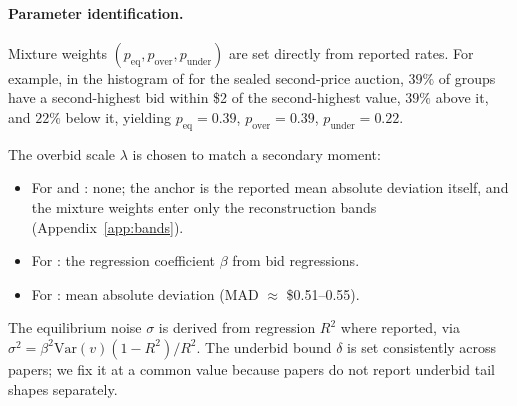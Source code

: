 \documentclass[acmsmall,screen,review]{acmart}
\newcommand{\rev}[1]{{\color{blue}#1}}
\newcommand{\rev}[1]{#1}
\begin{document}
\paragraph{Parameter identification.}
Mixture weights $(p_{\text{eq}}, p_{\text{over}}, p_{\text{under}})$ are set directly from reported rates. For example, \rev{in the histogram of \citet[Figure~2(a)]{li2017obviously} for the sealed second-price auction, $39\%$ of groups have a second-highest bid within \$2 of the second-highest value, $39\%$ above it, and $22\%$ below it,
yielding $p_{\text{eq}} = 0.39$, $p_{\text{over}} = 0.39$, $p_{\text{under}} = 0.22$.}

The overbid scale $\lambda$ is chosen to match a secondary moment:
\begin{itemize}
  \item For \citet{li2017obviously} and \citet{breitmoser2022obviousness}: \rev{none; the anchor is the reported mean absolute deviation itself, and the mixture weights enter only the reconstruction bands (Appendix~\ref{app:bands}).}
  \item For \citet{kagel1993independent}: the regression coefficient $\beta$ from bid regressions.
  \item For \citet{gonczarowski2023strategyproofness}: mean absolute deviation (MAD $\approx$ \$0.51--0.55).
\end{itemize}
The equilibrium noise $\sigma$ is derived from regression $R^2$ where reported, via $\sigma^2 = \beta^2 \text{Var}(v)(1-R^2)/R^2$. The underbid bound $\delta$ is set consistently across
papers; we fix it at a common value because papers do not report underbid tail shapes separately.
\end{document}
